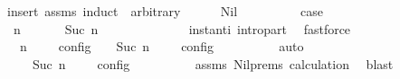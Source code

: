 \begin{isabellebody}
%
\isadelimproof
%
\endisadelimproof
%
\isatagproof
{}\isamarkupfalse%
\ {\isacharparenleft}insert\ assms{\isacharcomma}\ induct\ {\isasymPsi}\ arbitrary{\isacharcolon}\ {\isasymGamma}\ {\isasymPhi}{\isacharparenright}\isanewline
\ \ \isamarkupfalse%
\ {\isacharparenleft}Nil\ {\isasymGamma}\ {\isasymPhi}{\isacharparenright}\isanewline
\ \ \ \ \isamarkupfalse%
\ \isamarkupfalse%
\ {\isacharquery}case\isanewline
\ \ \ \ \isamarkupfalse%
\ {\isacharminus}\isanewline
\ \ \ \ \ \ \isamarkupfalse%
\ {\isacartoucheopen}{\isacharparenleft}{\isasymGamma}{\isacharcomma}\ n\ {\isasymturnstile}\ {\isacharbrackleft}{\isacharbrackright}\ {\isasymtriangleright}\ {\isasymPhi}{\isacharparenright}\ {\isasymhookrightarrow}\isactrlesup \ {\isacharparenleft}{\isasymGamma}{\isacharcomma}\ Suc\ n\ {\isasymturnstile}\ {\isasymPhi}\ {\isasymtriangleright}\ {\isacharbrackleft}{\isacharbrackright}{\isacharparenright}{\isacartoucheclose}\isanewline
\ \ \ \ \ \ \ \ \isamarkupfalse%
\ instant{\isacharunderscore}i\ intro{\isacharunderscore}part\ \isamarkupfalse%
\ fastforce\isanewline
\ \ \ \ \ \ \isamarkupfalse%
\ \isamarkupfalse%
\ {\isacartoucheopen}{\isasymlbrakk}\ {\isasymGamma}{\isacharcomma}\ n\ {\isasymturnstile}\ {\isacharbrackleft}{\isacharbrackright}\ {\isasymtriangleright}\ {\isasymPhi}\ {\isasymrbrakk}\isactrlsub c\isactrlsub o\isactrlsub n\isactrlsub f\isactrlsub i\isactrlsub g\ {\isacharequal}\ {\isasymlbrakk}\ {\isasymGamma}{\isacharcomma}\ Suc\ n\ {\isasymturnstile}\ {\isasymPhi}\ {\isasymtriangleright}\ {\isacharbrackleft}{\isacharbrackright}\ {\isasymrbrakk}\isactrlsub c\isactrlsub o\isactrlsub n\isactrlsub f\isactrlsub i\isactrlsub g{\isacartoucheclose}\isanewline
\ \ \ \ \ \ \ \ \isamarkupfalse%
\ auto\isanewline
\ \ \ \ \ \ \isamarkupfalse%
\ \isamarkupfalse%
\ {\isacartoucheopen}{\isasymrho}\ {\isasymin}\ {\isasymlbrakk}\ {\isasymGamma}{\isacharcomma}\ Suc\ n\ {\isasymturnstile}\ {\isasymPhi}\ {\isasymtriangleright}\ {\isacharbrackleft}{\isacharbrackright}\ {\isasymrbrakk}\isactrlsub c\isactrlsub o\isactrlsub n\isactrlsub f\isactrlsub i\isactrlsub g{\isacartoucheclose}\isanewline
\ \ \ \ \ \ \ \ \isamarkupfalse%
\ assms\ Nil{\isachardot}prems\ calculation{\isacharparenleft}{}{\isacharparenright}\ \isamarkupfalse%
\ blast\isanewline
\ \ \ \ \ \ \isamarkupfalse%

\end{isabellebody}
